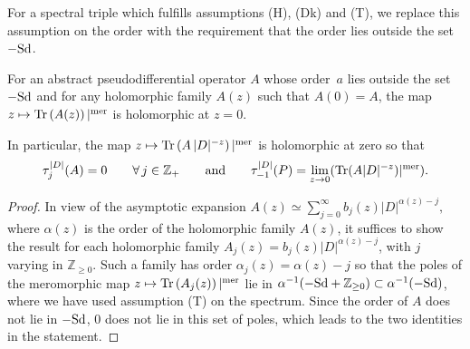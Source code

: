 \documentclass[pdftex]{sigma}
\def \Z {\mathbb Z}
\numberwithin{equation}{section}
\begin{document}
For a spectral triple which fulf\/ills assumptions (H), (Dk) and (T), we replace
this  assumption on the order  with the requirement that the
order lies outside the set $-{\rm Sd}$.

\begin{lemma} For an abstract pseudodifferential  operator $A$ whose order~$a$ lies outside the set $ -{\rm Sd}$  and for any
  holomorphic family $A(z)$ such that $A(0)=A$,
 the map $z\mapsto {\rm Tr} \left( A(z) \right)\vert^{\rm mer}$ is holomorphic at
  $z=0$.

 In particular,  the map $z\mapsto  {\rm
    Tr} \left( A\, \vert D\vert^{-z}\right)\vert^{\rm mer} $ is holomorphic at
  zero so that
  \[
  \tau_j^{\vert D\vert}(A)=0\qquad \forall\, j\in \Z_+\qquad {\rm and}\qquad \tau_{-1}^{\vert D\vert} (P)=\lim_{z\to 0} ({\rm
    Tr}  ( A \vert D\vert^{-z} )\vert^{\rm mer} ).
    \]
\end{lemma}
\begin{proof} In view of the asymptotic expansion $A(z)\simeq \sum\limits_{j=0}^\infty
b_j (z)\vert D\vert^{\alpha(z)-j},$
where   $\alpha(z)$ is the  order of the holomorphic family $A(z)$,
it suf\/f\/ices to show the result for each holomorphic family $A_j(z)= b_j(z)
\vert D\vert^{\alpha(z)-j}$, with $j$ varying in $\Z_{\geq 0}$.
Such a family  has order $\alpha_j(z)= \alpha(z)-j$ so that the  poles of the meromorphic map $z\mapsto {\rm
    Tr} \left( A_j(z) \right)\vert^{\rm mer}$  lie in
  $\alpha^{-1}(-{\rm Sd}+\Z_{\geq 0})\subset \alpha^{-1}(-{\rm Sd})$, where we have used
  assumption (T) on the spectrum.
 Since    the order of $A$ does not lie in $-{\rm Sd}$, $0$ does not lie in this set of
poles, which leads to the two identities in the statement.\end{proof}
\end{document}
